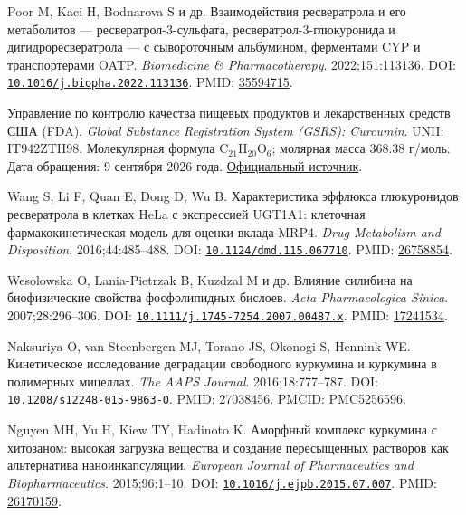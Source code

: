 \documentclass[11pt]{article}
\begin{document}
\begin{description}[before={\microtypesetup{expansion=false}\setlength{\RaggedRightRightskip}{0pt plus 4em}\RaggedRight}]
\item[{[97]}] Poor M, Kaci H, Bodnarova S и др. Взаимодействия ресвератрола и его метаболитов --- ресвератрол-3-сульфата, ресвератрол-3-глюкуронида и дигидроресвератрола --- с сывороточным альбумином, ферментами CYP и транспортерами OATP. \textit{\foreignlanguage{english}{Biomedicine \& Pharmacotherapy}}. 2022;151:113136. DOI: \href{https://doi.org/10.1016/j.biopha.2022.113136}{\nolinkurl{10.1016/j.biopha.2022.113136}}. PMID: \href{https://pubmed.ncbi.nlm.nih.gov/35594715/}{35594715}.

\item[{[98]}] Управление по контролю качества пищевых продуктов и лекарственных средств США (FDA). \textit{Global Substance Registration System (GSRS): Curcumin}. UNII: IT942ZTH98. Молекулярная формула \(\mathrm{C}_{21}\mathrm{H}_{20}\mathrm{O}_{6}\); молярная масса 368.38 г/моль. Дата обращения: 9 сентября 2026 года. \href{https://precision.fda.gov/ginas/app/ui/substances/IT942ZTH98}{Официальный источник}.

\item[{[99]}] Wang S, Li F, Quan E, Dong D, Wu B. Характеристика эффлюкса глюкуронидов ресвератрола в клетках HeLa с экспрессией UGT1A1: клеточная фармакокинетическая модель для оценки вклада MRP4. \textit{\foreignlanguage{english}{Drug Metabolism and Disposition}}. 2016;44:485--488. DOI: \href{https://doi.org/10.1124/dmd.115.067710}{\nolinkurl{10.1124/dmd.115.067710}}. PMID: \href{https://pubmed.ncbi.nlm.nih.gov/26758854/}{26758854}.
\item[{[100]}] Wesolowska O, Lania-Pietrzak B, Kuzdzal M и др. Влияние силибина на биофизические свойства фосфолипидных бислоев. \textit{\foreignlanguage{english}{Acta Pharmacologica Sinica}}. 2007;28:296--306. DOI: \href{https://doi.org/10.1111/j.1745-7254.2007.00487.x}{\nolinkurl{10.1111/j.1745-7254.2007.00487.x}}. PMID: \href{https://pubmed.ncbi.nlm.nih.gov/17241534/}{17241534}.
\item[{[101]}] Naksuriya O, van Steenbergen MJ, Torano JS, Okonogi S, Hennink WE. Кинетическое исследование деградации свободного куркумина и куркумина в полимерных мицеллах. \textit{\foreignlanguage{english}{The AAPS Journal}}. 2016;18:777--787. DOI: \href{https://doi.org/10.1208/s12248-015-9863-0}{\nolinkurl{10.1208/s12248-015-9863-0}}. PMID: \href{https://pubmed.ncbi.nlm.nih.gov/27038456/}{27038456}. PMCID: \href{https://pmc.ncbi.nlm.nih.gov/articles/PMC5256596/}{PMC5256596}.
\item[{[102]}] Nguyen MH, Yu H, Kiew TY, Hadinoto K. Аморфный комплекс куркумина с хитозаном: высокая загрузка вещества и создание пересыщенных растворов как альтернатива наноинкапсуляции. \textit{\foreignlanguage{english}{European Journal of Pharmaceutics and Biopharmaceutics}}. 2015;96:1--10. DOI: \href{https://doi.org/10.1016/j.ejpb.2015.07.007}{\nolinkurl{10.1016/j.ejpb.2015.07.007}}. PMID: \href{https://pubmed.ncbi.nlm.nih.gov/26170159/}{26170159}.


\end{description}
\end{document}
